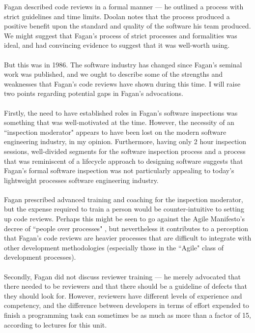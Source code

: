 Fagan described code reviews in a formal manner --- he outlined a process with strict guidelines and
time limits.
Doolan \cite{doolan1992experience} notes that the process produced a positive benefit upon the
standard and quality of the software his team produced.
We might suggest that Fagan's process of strict processes and formalities was ideal, and had
convincing evidence to suggest that it was well-worth using.\\
\\
But this was in 1986.
The software industry has changed since Fagan's seminal work was published, and we ought to describe
some of the strengths and weaknesses that Fagan's code reviews have shown during this time.
I will raise two points regarding potential gaps in Fagan's advocations.\\
\\
Firstly, the need to have established roles in Fagan's software inspections was something that was
well-motivated at the time.
However, the necessity of an ``inspection moderator" appears to have been lost on the modern
software engineering industry, in my opinion.
Furthermore, having only 2 hour inspection sessions, well-divided segments for the software inspection process
and a process that was reminiscent of a lifecycle approach to designing software suggests that
Fagan's formal software inspection was not particularly appealing to today's lightweight processes
software engineering industry.\\
\\
Fagan prescribed advanced training and coaching for the inspection moderator, but the expense
required to train a person would be counter-intuitive to setting up code reviews.
Perhaps this might be seen to go against the Agile Manifesto's decree of ``people over processes"
\cite{fowler2001agile}, but nevertheless it contributes to a perception that Fagan's code reviews are heavier
processes that are difficult to integrate with other development methodologies (especially those in
the ``Agile" class of development processes).\\
\\
Secondly, Fagan did not discuss reviewer training --- he merely advocated that there needed to be
reviewers and that there should be a guideline of defects that they should look for.
However, reviewers have different levels of experience and competency, and the difference between
developers in terms of effort expended to finish a programming task can sometimes be as much as more
than a factor of 15, according to lectures for this unit.
